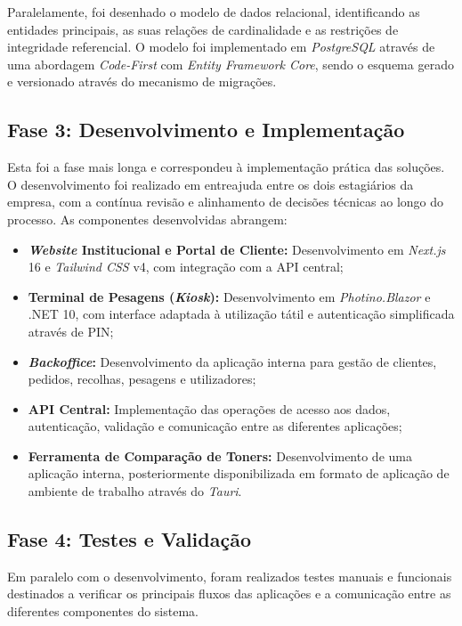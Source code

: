 Paralelamente, foi desenhado o modelo de dados relacional, identificando as entidades principais, as suas relações de cardinalidade e as restrições de integridade referencial. O modelo foi implementado em \textit{PostgreSQL} através de uma abordagem \textit{Code-First} com \textit{Entity Framework Core}, sendo o esquema gerado e versionado através do mecanismo de migrações.

\subsection{Fase 3: Desenvolvimento e Implementação}

Esta foi a fase mais longa e correspondeu à implementação prática das soluções. O desenvolvimento foi realizado em entreajuda entre os dois estagiários da empresa, com a contínua revisão e alinhamento de decisões técnicas ao longo do processo. As componentes desenvolvidas abrangem:
\begin{itemize}
    \item \textbf{\textit{Website} Institucional e Portal de Cliente:} Desenvolvimento em \textit{Next.js} 16 e \textit{Tailwind \ac{CSS}} v4, com integração com a \ac{API} central;
    \item \textbf{Terminal de Pesagens (\textit{Kiosk}):} Desenvolvimento em \textit{Photino.Blazor} e .NET 10, com interface adaptada à utilização tátil e autenticação simplificada através de PIN;
    \item \textbf{\textit{Backoffice}:} Desenvolvimento da aplicação interna para gestão de clientes, pedidos, recolhas, pesagens e utilizadores;
    \item \textbf{\ac{API} Central:} Implementação das operações de acesso aos dados, autenticação, validação e comunicação entre as diferentes aplicações;
    \item \textbf{Ferramenta de Comparação de Toners:} Desenvolvimento de uma aplicação interna, posteriormente disponibilizada em formato de aplicação de ambiente de trabalho através do \textit{Tauri}.
\end{itemize}


\subsection{Fase 4: Testes e Validação}

Em paralelo com o desenvolvimento, foram realizados testes manuais e funcionais destinados a verificar os principais fluxos das aplicações e a comunicação entre as diferentes componentes do sistema.

